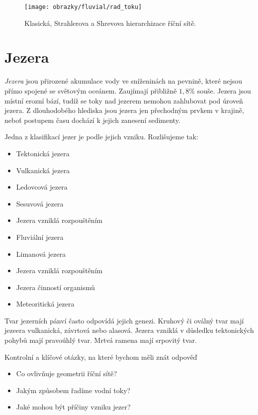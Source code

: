 \begin{figure}
	\centering
	\texttt{[image: obrazky/fluvial/rad\_toku]}
	\caption{Klasická, Strahlerova a Shrevova hierarchizace říční sítě.}
	\label{fig:radtoku}
\end{figure}


\section{Jezera}
\emph{Jezera} jsou přirozené akumulace vody ve sníženinách na pevnině, které nejsou přímo spojené se světovým oceánem. Zaujímají přibližně $1,8 \%$ souše. Jezera jsou místní erozní bází, tudíž se toky nad jezerem nemohou zahlubovat pod úroveň jezera. Z dlouhodobého hlediska jsou jezera jen přechodným prvkem v krajině, neboť postupem času dochází k jejich zanesení sedimenty. 

Jedna z klasifikací jezer je podle jejich vzniku. Rozlišujeme tak:
\begin{itemize}
	\item Tektonická jezera	
	\item Vulkanická jezera
	\item Ledovcová jezera
	\item Sesuvová jezera
	\item Jezera vzniklá rozpouštěním
	\item Fluviální jezera
	\item Limanová jezera
	\item Jezera vzniklá rozpouštěním
	\item Jezera činností organismů
	\item Meteoritická jezera
\end{itemize}

Tvar jezerních pánví často odpovídá jejich genezi. Kruhový či oválný tvar mají jezeera vulkanická, závrtová nebo alasová. Jezera vzniklá v důsledku tektonických pohybů mají pravoúhlý tvar. Mrtvá ramena mají srpovitý tvar.






\newpage
\onecolumn
\begin{boxotazky}{Kontrolní a klíčové otázky, na které bychom měli znát odpověď}
	\begin{itemize}
		\item Co ovlivňuje geometrii říční sítě? 
		\item Jakým způsobem řadíme vodní toky?
		\item Jaké mohou být příčiny vzniku jezer?		
	\end{itemize}
\end{boxotazky}
%
%	
\twocolumn

